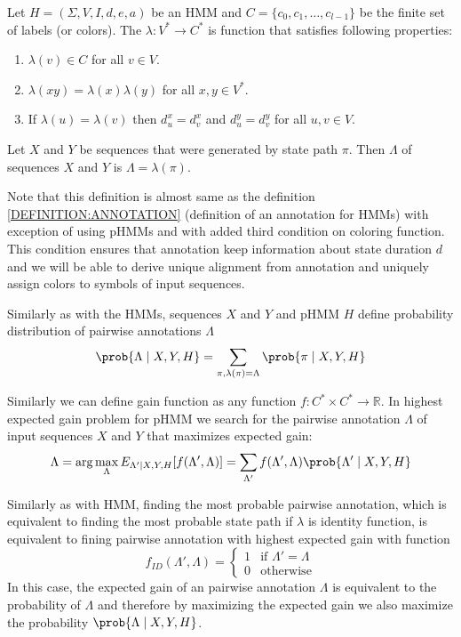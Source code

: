 \begin{definition}
Let $H=(\Sigma,V,I,d,e,a)$ be an HMM and $C=\{c_0,c_1,\dots,c_{l-1}\}$ be the
finite set of labels (or colors). The 
$\lambda:V^*\to C^*$ is function that satisfies following properties: 
\begin{enumerate}
\item $\lambda(v)\in C$ for all $v\in V$.
\item $\lambda(xy) = \lambda(x)\lambda(y)$ for all $x,y\in V^*$.
\item If $\lambda(u)=\lambda(v)$ then $d^x_u=d^x_v$ and $d^y_u=d^y_v$ for all
$u,v\in V$.
\end{enumerate}
Let $X$ and $Y$ be sequences that were generated by state path $\pi$. Then
 $\Lambda$ of sequences $X$ and $Y$ is 
$\Lambda=\lambda(\pi)$.
\end{definition}

Note that this definition is almost same as the definition
\ref{DEFINITION:ANNOTATION} (definition of an annotation for HMMs) with exception of using pHMMs and with added 
third condition on coloring function. This condition ensures that 
annotation keep information about state duration $d$ and we will
be able to derive unique alignment from annotation and uniquely assign
colors to symbols of input sequences.

Similarly as with the HMMs, sequences $X$ and $Y$ and pHMM $H$ define
probability distribution of pairwise annotations $\Lambda$
\[\prob{\Lambda\mid X,Y,H} = \sum_{\pi,\lambda(\pi)=\Lambda}\prob{\pi\mid
X,Y,H}\]

Similarly we can define gain function as any function $f:C^*\times C^*\to
\mathbb{R}$. In highest expected gain problem for pHMM we search for
the pairwise annotation $\Lambda$ of input sequences $X$ and $Y$ that maximizes
expected gain:
\[\Lambda = \arg\max_{\Lambda} E_{\Lambda'\mid X,Y,H}[f(\Lambda',\Lambda)]
=  \sum_{\Lambda'}f(\Lambda',\Lambda)\prob{\Lambda'\mid X,Y,H}\]

Similarly as with HMM, finding the most probable pairwise annotation, which is equivalent
to finding the most probable state path if $\lambda$ is identity function,
is equivalent to fining pairwise annotation with highest expected gain with
function
\[f_{ID}(\Lambda',\Lambda) = \begin{cases}
1 & \text{if $\Lambda'=\Lambda$}\\
0 & \text{otherwise}
\end{cases}\]
In this case, the expected gain of an pairwise annotation $\Lambda$ is
equivalent to the probability of $\Lambda$ and therefore by maximizing the
expected gain we also maximize the probability $\prob{\Lambda\mid X,Y,H}$.


